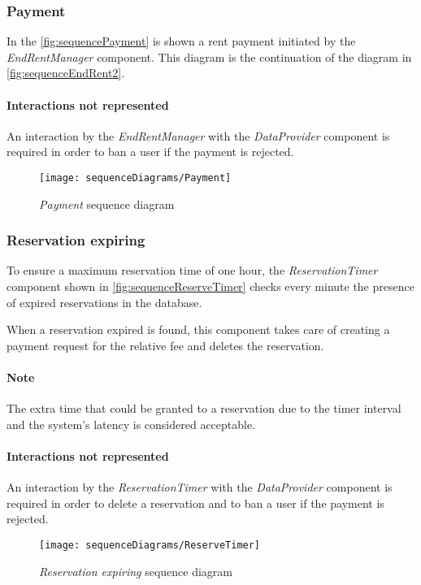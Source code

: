 \clearpage
\subsubsection{Payment}
In the \autoref{fig:sequencePayment} is shown a rent payment initiated by the \emph{EndRentManager} component. This diagram is the continuation of the diagram in \autoref{fig:sequenceEndRent2}.

\paragraph{Interactions not represented} An interaction by the \emph{EndRentManager} with the \emph{DataProvider} component is required in order to ban a user if the payment is rejected.
\begin{figure}[h!]
	\centering
	\texttt{[image: sequenceDiagrams/Payment]}
	\caption{
		\label{fig:sequencePayment} 
		\emph{Payment} sequence diagram
	}
\end{figure}

\clearpage
\subsubsection{Reservation expiring}
To ensure a maximum reservation time of one hour, the \emph{ReservationTimer} component shown in \autoref{fig:sequenceReserveTimer} checks every minute the presence of expired reservations in the database. 

When a reservation expired is found, this component takes care of creating a payment request for the relative fee and deletes the reservation. 

\paragraph{Note}The extra time that could be granted to a reservation due to the timer interval and the system's latency is considered acceptable.

\paragraph{Interactions not represented} An interaction by the \emph{ReservationTimer} with the \emph{DataProvider} component is required in order to delete a reservation and to ban a user if the payment is rejected.
\begin{figure}[h!]
	\centering
	\texttt{[image: sequenceDiagrams/ReserveTimer]}
	\caption{
		\label{fig:sequenceReserveTimer} 
		\emph{Reservation expiring} sequence diagram
	}
\end{figure}

